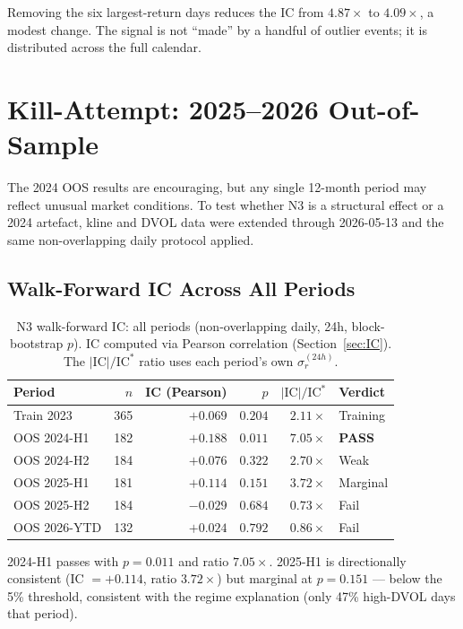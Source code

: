 \documentclass[12pt, a4paper]{article}
\theoremstyle{plain}
\theoremstyle{definition}
\newcommand{\IC}{\mathrm{IC}}
\begin{document}
Removing the six largest-return days reduces the IC from $4.87\times$ to
$4.09\times$, a modest change. The signal is not ``made'' by a handful of
outlier events; it is distributed across the full calendar.


\section{Kill-Attempt: 2025--2026 Out-of-Sample}
\label{sec:kill}

The 2024 OOS results are encouraging, but any single 12-month period
may reflect unusual market conditions. To test whether N3 is a structural
effect or a 2024 artefact, kline and DVOL data were extended through
2026-05-13 and the same non-overlapping daily protocol applied.

\subsection{Walk-Forward IC Across All Periods}

\begin{table}[H]
\centering
\caption{N3 walk-forward IC: all periods (non-overlapping daily, 24h, block-bootstrap $p$).
IC computed via Pearson correlation (Section~\ref{sec:IC}).
The $|\IC|/\IC^*$ ratio uses each period's own $\sigma_r^{(24h)}$.}
\label{tab:n3_wf_all}
\begin{tabular}{lrrrrl}
\toprule
Period & $n$ & IC (Pearson) & $p$ & $|\IC|/\IC^*$ & Verdict \\
\midrule
Train 2023    & 365 & $+0.069$ & $0.204$ & $2.11\times$ & Training \\
OOS 2024-H1   & 182 & $+0.188$ & $0.011$ & $7.05\times$ & \textbf{PASS} \\
OOS 2024-H2   & 184 & $+0.076$ & $0.322$ & $2.70\times$ & Weak \\
OOS 2025-H1   & 181 & $+0.114$ & $0.151$ & $3.72\times$ & Marginal \\
OOS 2025-H2   & 184 & $-0.029$ & $0.684$ & $0.73\times$ & Fail \\
OOS 2026-YTD  & 132 & $+0.024$ & $0.792$ & $0.86\times$ & Fail \\
\bottomrule
\end{tabular}
\end{table}

2024-H1 passes with $p = 0.011$ and ratio $7.05\times$.
2025-H1 is directionally consistent (IC $= +0.114$, ratio $3.72\times$) but
marginal at $p = 0.151$ --- below the 5\% threshold, consistent with the
regime explanation (only 47\% high-DVOL days that period).
\end{document}
